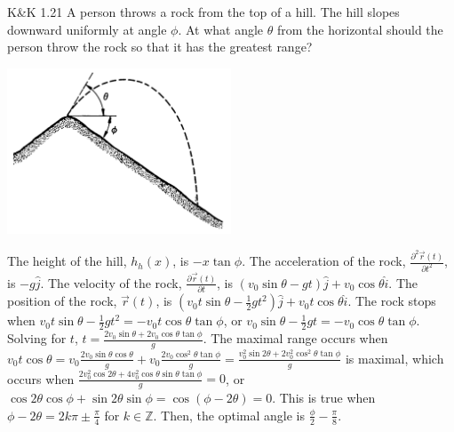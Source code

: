 \documentclass{esg8012pset}
\begin{document}
\begin{problem}{K\&K 1.21}
  A person throws a rock from the top of a hill. The hill slopes downward uniformly at angle $\phi$. At
  what angle $\theta$ from the horizontal should the person throw the rock so that it has the greatest
  range?
  \begin{center}\includegraphics[width=0.5\textwidth]{ps01_4}\end{center}
\end{problem}
\begin{solution}
  The height of the hill, $h_h(x)$, is $-x\tan \phi$.  The acceleration of the rock, $\frac{\partial^2 \vec r(t)}{\partial t^2}$, is $-g\hat j$.  The velocity of the rock, $\frac{\partial \vec r(t)}{\partial t}$, is $(v_0\sin\theta -gt)\hat j + v_0\cos\theta \hat i$.  The position of the rock, $\vec r(t)$, is $\left(v_0 t\sin\theta -\frac{1}{2}gt^2\right)\hat j + v_0 t\cos\theta \hat i$.  The rock stops when $v_0 t\sin\theta -\frac{1}{2}gt^2 = -v_0 t \cos\theta\tan \phi$, or $v_0\sin\theta -\frac{1}{2}gt = -v_0 \cos\theta\tan \phi$.  Solving for $t$, $t = \frac{2v_0\sin\theta + 2v_0 \cos\theta\tan \phi}{g}$.  The maximal range occurs when $v_0 t\cos\theta = v_0 \frac{2v_0\sin\theta\cos\theta}{g} + v_0\frac{2v_0 \cos^2\theta\tan \phi}{g} = \frac{v_0^2\sin2\theta + 2v_0^2 \cos^2\theta\tan \phi}{g}$ is maximal, which occurs when $\frac{2v_0^2\cos2\theta + 4v_0^2 \cos\theta\sin\theta\tan \phi}{g} = 0$, or $\cos2\theta\cos\phi + \sin2\theta\sin \phi = \cos(\phi - 2\theta) = 0$.  This is true when $\phi - 2\theta = 2k\pi \pm \frac{\pi}{4}$ for $k\in\mathbb{Z}$.  Then, the optimal angle is $\frac{\phi}{2} - \frac{\pi}{8}$.
\end{solution}
\end{document}
